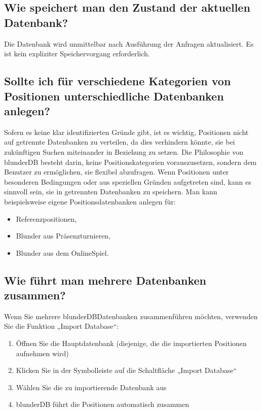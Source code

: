 \documentclass[letterpaper,10pt,german]{sphinxmanual}
\begin{document}
\subsection{Wie speichert man den Zustand der aktuellen Datenbank?}
\label{\detokenize{faq:comment-sauvegarder-la-base-de-donnees-courante}}
\sphinxAtStartPar
Die Datenbank wird unmittelbar nach Ausführung der Anfragen aktualisiert. Es ist kein expliziter Speichervorgang erforderlich.


\subsection{Sollte ich für verschiedene Kategorien von Positionen unterschiedliche Datenbanken anlegen?}
\label{\detokenize{faq:dois-je-creer-differentes-bases-de-donnees-pour-differentes-categories-de-positions}}
\sphinxAtStartPar
Sofern es keine klar identifizierten Gründe gibt, ist es wichtig, Positionen nicht auf getrennte Datenbanken zu verteilen, da dies verhindern könnte, sie bei zukünftigen Suchen miteinander in Beziehung zu setzen. Die Philosophie von blunderDB besteht darin, keine Positionskategorien  vorauszusetzen, sondern dem Benutzer zu ermöglichen, sie flexibel abzufragen. Wenn Positionen unter besonderen Bedingungen oder aus speziellen Gründen aufgetreten sind, kann es sinnvoll sein, sie in getrennten Datenbanken zu speichern. Man kann beispielsweise eigene Positionsdatenbanken anlegen für:
\begin{itemize}
\item {} 
\sphinxAtStartPar
Referenzpositionen,

\item {} 
\sphinxAtStartPar
Blunder aus Präsenzturnieren,

\item {} 
\sphinxAtStartPar
Blunder aus dem Online\sphinxhyphen{}Spiel.

\end{itemize}


\subsection{Wie führt man mehrere Datenbanken zusammen?}
\label{\detokenize{faq:comment-fusionner-plusieurs-bases-de-donnees}}
\sphinxAtStartPar
Wenn Sie mehrere blunderDB\sphinxhyphen{}Datenbanken zusammenführen möchten, verwenden Sie die Funktion „Import Database“:
\begin{enumerate}
%
\item {} 
\sphinxAtStartPar
Öffnen Sie die Hauptdatenbank (diejenige, die die importierten Positionen aufnehmen wird)

\item {} 
\sphinxAtStartPar
Klicken Sie in der Symbolleiste auf die Schaltfläche „Import Database“

\item {} 
\sphinxAtStartPar
Wählen Sie die zu importierende Datenbank aus

\item {} 
\sphinxAtStartPar
blunderDB führt die Positionen automatisch zusammen

\end{enumerate}
\end{document}
